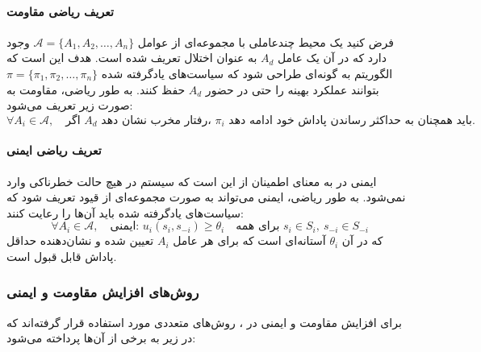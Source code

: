 \paragraph{تعریف ریاضی مقاومت}

فرض کنید یک محیط چندعاملی با مجموعه‌ای از عوامل \( \mathcal{A} = \{A_1, A_2, \dots, A_n\} \) وجود دارد که در آن یک عامل \( A_d \) به عنوان اختلال تعریف شده است. هدف این است که الگوریتم  به گونه‌ای طراحی شود که سیاست‌های یادگرفته شده \( \pi = \{\pi_1, \pi_2, \dots, \pi_n\} \) بتوانند عملکرد بهینه را حتی در حضور \( A_d \) حفظ کنند. به طور ریاضی، مقاومت به صورت زیر تعریف می‌شود:
\[
\forall A_i \in \mathcal{A}, \quad \text{اگر } A_d \text{ رفتار مخرب نشان دهد، } \pi_i \text{ باید همچنان به حداکثر رساندن پاداش خود ادامه دهد.}
\]

\paragraph{تعریف ریاضی ایمنی}

ایمنی در  به معنای اطمینان از این است که سیستم در هیچ حالت خطرناکی وارد نمی‌شود. به طور ریاضی، ایمنی می‌تواند به صورت مجموعه‌ای از قیود تعریف شود که سیاست‌های یادگرفته شده باید آن‌ها را رعایت کنند:
\[
\forall A_i \in \mathcal{A}, \quad \text{ایمنی: } u_i(s_i, s_{-i}) \geq \theta_i \quad \text{برای همه } s_i \in S_i, \ s_{-i} \in S_{-i}
\]
که در آن \( \theta_i \) آستانه‌ای است که برای هر عامل \( A_i \) تعیین شده و نشان‌دهنده حداقل پاداش قابل قبول است.

\subsubsection{روش‌های افزایش مقاومت و ایمنی}

برای افزایش مقاومت و ایمنی در ، روش‌های متعددی مورد استفاده قرار گرفته‌اند که در زیر به برخی از آن‌ها پرداخته می‌شود:


